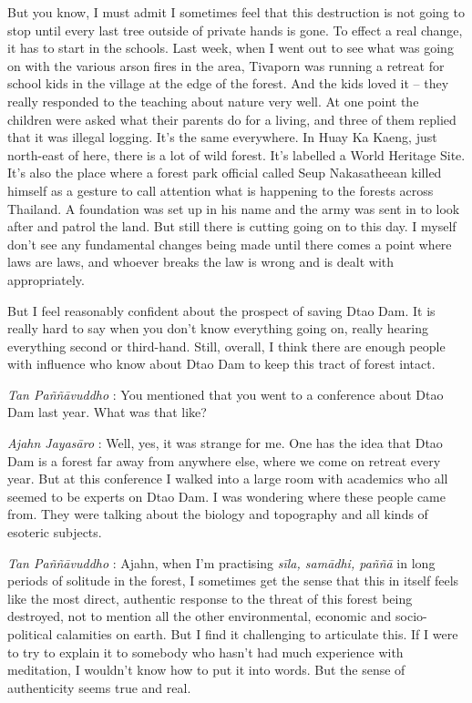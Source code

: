 But you know, I must admit I sometimes feel that this destruction is not
going to stop until every last tree outside of private hands is gone. To
effect a real change, it has to start in the schools. Last week, when I
went out to see what was going on with the various arson fires in the
area, Tivaporn was running a retreat for school kids in the village at
the edge of the forest. And the kids loved it -- they really responded
to the teaching about nature very well. At one point the children were
asked what their parents do for a living, and three of them replied that
it was illegal logging. It's the same everywhere. In Huay Ka Kaeng, just
north-east of here, there is a lot of wild forest. It's labelled a World
Heritage Site. It's also the place where a forest park official called
Seup Nakasatheean killed himself as a gesture to call attention what is
happening to the forests across Thailand. A foundation was set up in his
name and the army was sent in to look after and patrol the land. But
still there is cutting going on to this day. I myself don't see any
fundamental changes being made until there comes a point where laws are
laws, and whoever breaks the law is wrong and is dealt with
appropriately.

But I feel reasonably confident about the prospect of saving Dtao Dam.
It is really hard to say when you don't know everything going on, really
hearing everything second or third-hand. Still, overall, I think there
are enough people with influence who know about Dtao Dam to keep this
tract of forest intact.

\emph{Tan Paññāvuddho} : You mentioned that you went to a conference
about Dtao Dam last year. What was that like?

\emph{Ajahn Jayasāro }: Well, yes, it was strange for me. One has the
idea that Dtao Dam is a forest far away from anywhere else, where we
come on retreat every year. But at this conference I walked into a large
room with academics who all seemed to be experts on Dtao Dam. I was
wondering where these people came from. They were talking about the
biology and topography and all kinds of esoteric subjects.

\emph{Tan Paññāvuddho} : Ajahn, when I'm practising \emph{sīla, samādhi,
paññā} in long periods of solitude in the forest, I sometimes get the
sense that this in itself feels like the most direct, authentic response
to the threat of this forest being destroyed, not to mention all the
other environmental, economic and socio-political calamities on earth.
But I find it challenging to articulate this. If I were to try to
explain it to somebody who hasn't had much experience with meditation, I
wouldn't know how to put it into words. But the sense of authenticity
seems true and real.

